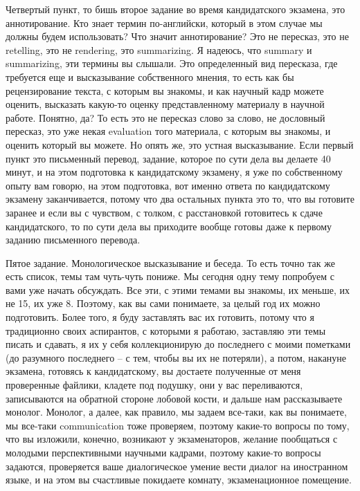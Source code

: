 \documentclass[main.tex]{subfiles}
\begin{document}
Четвертый пункт, то бишь второе задание во время кандидатского экзамена, это аннотирование.
Кто знает термин по-английски, который в этом случае мы должны будем использовать?
Что значит аннотирование?
Это не пересказ, это не retelling, это не rendering, это summarizing.
Я надеюсь, что summary и summarizing, эти термины вы слышали.
Это определенный вид пересказа, где требуется еще и высказывание собственного мнения, то есть как бы рецензирование текста, с которым вы знакомы, и как научный кадр можете оценить, высказать какую-то оценку представленному материалу в научной работе.
Понятно, да?
То есть это не пересказ слово за слово, не дословный пересказ, это уже некая evaluation того материала, с которым вы знакомы, и оценить который вы можете.
Но опять же, это устная высказывание.
Если первый пункт это письменный перевод, задание, которое по сути дела вы делаете 40 минут, и на этом подготовка к кандидатскому экзамену, я уже по собственному опыту вам говорю, на этом подготовка, вот именно ответа по кандидатскому экзамену заканчивается, потому что два остальных пункта это то, что вы готовите заранее и если вы с чувством, с толком, с расстановкой готовитесь к сдаче кандидатского, то по сути дела вы приходите вообще готовы даже к первому заданию письменного перевода.

Пятое задание.
Монологическое высказывание и беседа.
То есть точно так же есть список, темы там чуть-чуть пониже.
Мы сегодня одну тему попробуем с вами уже начать обсуждать.
Все эти, с этими темами вы знакомы, их меньше, их не 15, их уже 8.
Поэтому, как вы сами понимаете, за целый год их можно подготовить.
Более того, я буду заставлять вас их готовить, потому что я традиционно своих аспирантов, с которыми я работаю, заставляю эти темы писать и сдавать, я их у себя коллекционирую до последнего с моими пометками (до разумного последнего -- с тем, чтобы вы их не потеряли), а потом, накануне экзамена, готовясь к кандидатскому, вы достаете полученные от меня проверенные файлики, кладете под подушку, они у вас переливаются, записываются на обратной стороне лобовой кости, и дальше нам рассказываете монолог.
Монолог, а далее, как правило, мы задаем все-таки, как вы понимаете, мы все-таки communication тоже проверяем, поэтому какие-то вопросы по тому, что вы изложили, конечно, возникают у экзаменаторов, желание пообщаться с молодыми перспективными научными кадрами, поэтому какие-то вопросы задаются, проверяется ваше диалогическое умение вести диалог на иностранном языке, и на этом вы счастливые покидаете комнату, экзаменационное помещение.
\end{document}
